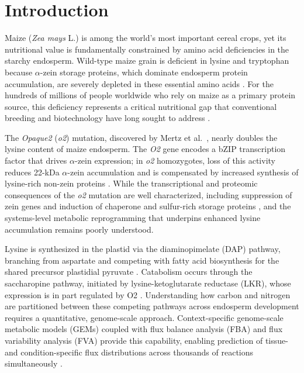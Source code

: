 \documentclass[12pt,a4paper]{article}
\begin{document}
\newpage

\section{Introduction}

Maize (\textit{Zea mays} L.) is among the world's most important cereal crops, yet its nutritional value is fundamentally constrained by amino acid deficiencies in the starchy endosperm. Wild-type maize grain is deficient in lysine and tryptophan because $\alpha$-zein storage proteins, which dominate endosperm protein accumulation, are severely depleted in these essential amino acids \citep{Shiferaw2011, Mertz1964}. For the hundreds of millions of people worldwide who rely on maize as a primary protein source, this deficiency represents a critical nutritional gap that conventional breeding and biotechnology have long sought to address \citep{Coleman2003, Wu2010}.

The \textit{Opaque2} (\textit{o2}) mutation, discovered by Mertz et al.\ \citep{Mertz1964}, nearly doubles the lysine content of maize endosperm. The \textit{O2} gene encodes a bZIP transcription factor that drives $\alpha$-zein expression; in \textit{o2} homozygotes, loss of this activity reduces 22-kDa $\alpha$-zein accumulation and is compensated by increased synthesis of lysine-rich non-zein proteins \citep{Schmidt1990, Hartings1989, Habben1993}. While the transcriptional and proteomic consequences of the \textit{o2} mutation are well characterized, including suppression of zein genes and induction of chaperone and sulfur-rich storage proteins \citep{Hunter2002, Jia2013, Zhang2016}, and the systems-level metabolic reprogramming that underpins enhanced lysine accumulation remains poorly understood.

Lysine is synthesized in the plastid via the diaminopimelate (DAP) pathway, branching from aspartate and competing with fatty acid biosynthesis for the shared precursor plastidial pyruvate \citep{Galili1995, Azevedo2006, Galili2002}. Catabolism occurs through the saccharopine pathway, initiated by lysine-ketoglutarate reductase (LKR), whose expression is in part regulated by O2 \citep{Kemper1999, Arruda2000}. Understanding how carbon and nitrogen are partitioned between these competing pathways across endosperm development requires a quantitative, genome-scale approach. Context-specific genome-scale metabolic models (GEMs) coupled with flux balance analysis (FBA) and flux variability analysis (FVA) provide this capability, enabling prediction of tissue- and condition-specific flux distributions across thousands of reactions simultaneously \citep{Orth2010, Feist2010, Saha2014, Mahadevan2003}.
\end{document}
